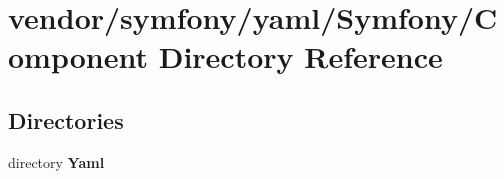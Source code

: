 \section{vendor/symfony/yaml/\+Symfony/\+Component Directory Reference}
\label{dir_4e2a8f0bf5b61651a2f35c2f04d916ef}
\subsection*{Directories}
\begin{DoxyCompactItemize}
\item 
directory {\bf Yaml}
\end{DoxyCompactItemize}
